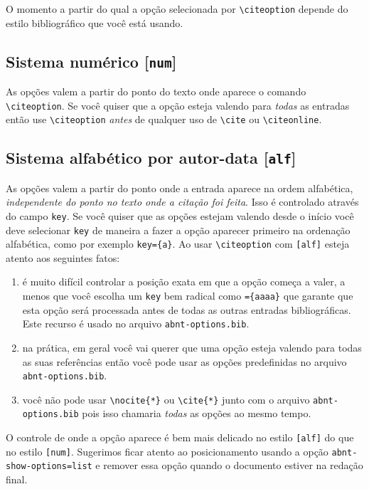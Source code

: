 \documentclass[espacosimples]{abnt}
\begin{document}
O momento a partir do qual a opção selecionada por \verb+\citeoption+
depende do estilo bibliográfico que você está usando.

\subsection{Sistema numérico [{\tt num}]}
As opções valem a partir
do ponto do texto onde aparece o comando \verb+\citeoption+.
Se você quiser que a opção esteja valendo para \emph{todas}
as entradas então use \verb+\citeoption+ \emph{antes} de
qualquer uso de \verb+\cite+ ou \verb+\citeonline+.

\subsection{Sistema alfabético por autor-data [{\tt alf}]}
As opções valem a partir do ponto onde a entrada aparece na ordem alfabética,
\emph{independente do ponto no texto onde a citação foi feita}.
Isso é controlado através do campo {\tt key}. Se você quiser que
as opções estejam valendo desde o início você deve selecionar {\tt key}
de maneira a fazer a opção aparecer primeiro na ordenação alfabética,
como por exemplo {\tt key=\{a\}}.
Ao usar \verb+\citeoption+ com {\tt [alf]} esteja atento aos
seguintes fatos:
\begin{enumerate}
\item é muito difícil controlar a posição exata em que a opção
      começa a valer, a menos que você escolha um {\tt key} bem
      radical como {\tt=\{aaaa\}} que garante que esta opção será
      processada antes de todas as outras entradas bibliográficas.
      Este recurso é usado no arquivo {\tt abnt-options.bib}.
\item na prática, em geral você vai querer que uma opção esteja
      valendo para todas as suas referências então você pode usar
      as opções predefinidas no arquivo {\tt abnt-options.bib}.
\item você não pode usar \verb+\nocite{*}+ ou \verb+\cite{*}+
      junto com o arquivo
      {\tt abnt-options.bib} pois isso chamaria \emph{todas} as
      opções ao mesmo tempo.
\end{enumerate}


O controle de onde a opção aparece é bem mais delicado no estilo {\tt [alf]}
do que no estilo {\tt [num]}. Sugerimos ficar atento ao posicionamento
usando a opção {\tt abnt-show-options=list} e remover essa opção quando o
documento estiver na redação final.
\end{document}
